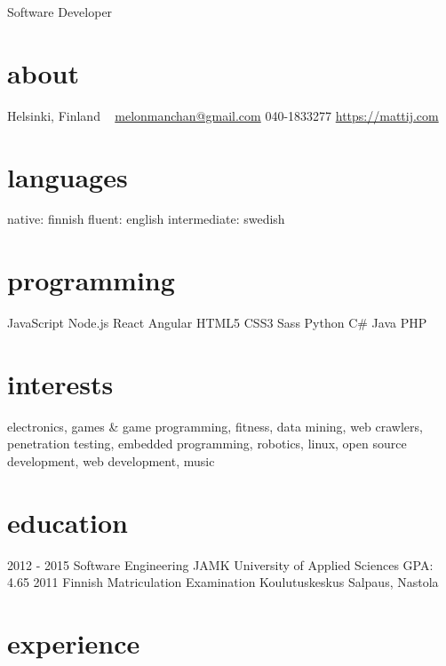\documentclass[]{friggeri-cv}
\begin{document}
       {Software Developer}


\begin{aside}
  \section{about}
    Helsinki,
    Finland
    ~
    \href{mailto:melonmanchan@gmail.com}{melonmanchan@gmail.com}
    040-1833277
    \href{https://mattij.com/}{https://mattij.com}
  \section{languages}
    native: finnish
    fluent: english
    intermediate: swedish
  \section{programming}
    JavaScript
    Node.js
    React
    Angular
    HTML5
    CSS3
    Sass
    Python
    C\#
    Java
    PHP
\end{aside}

\section{interests}

electronics, games \& game programming, fitness, data mining, web crawlers, penetration
testing, embedded programming, robotics, linux, open source development, web development, music

\section{education}

\begin{entrylist}
  \entry
    {2012 - 2015}
    {Software Engineering}
    {JAMK University of Applied Sciences}
    {GPA: 4.65}
  \entry
    {2011}
    {Finnish Matriculation Examination}
    {Koulutuskeskus Salpaus, Nastola}
    {}
\end{entrylist}

\section{experience}
\end{document}

